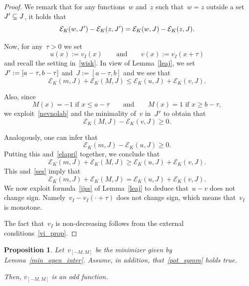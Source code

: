 \documentclass[10pt,a4paper]{amsart}
\newtheorem{prop}[theorem]{Proposition}
\numberwithin{equation}{section}
\newcommand{\Ec}{\mathcal{E}_K}
\begin{document}
\begin{proof}
We remark that for any functions~$w$ and~$z$ such that~$w=z$ outside a set~$J\rq{} \subseteq J$, it holds that
\begin{equation}\label{nevnolab}
\Ec(w,J\rq{})-\Ec(z,J\rq{})= \Ec(w,J)-\Ec(z,J).
\end{equation}

Now, for any~$\tau>0$ we set
\begin{equation*}
u(x):= v_I(x) \qquad\mbox{and}\qquad v(x) := v_I(x + \tau)
\end{equation*}
and recall the setting in~\eqref{wisk}. In view of Lemma~\ref{leaj}, we set~$J\rq{}:= [a-\tau, b-\tau]$ and~$J:=[a-\tau,b]$ and we see that
\begin{equation}\label{ses}
\Ec(m, J) + \Ec(M, J) \leq \Ec(u, J)  + \Ec(v, J).
\end{equation}

Also, since
\begin{equation*}
M(x)= -1 \mbox{ if } x \leq a-\tau \qquad\mbox{and}\qquad M(x)= 1 \mbox{ if } x \geq b-\tau,
\end{equation*}
we exploit~\eqref{nevnolab} and the minimality of~$v$ in~$J\rq{}$ to obtain that
\begin{equation}\label{elapri}
\Ec(M, J) - \Ec(v, J) \geq 0.
\end{equation}

Analogously, one can infer that
\begin{equation*}
\Ec(m, J) - \Ec(u, J) \geq 0.
\end{equation*}
Putting this and~\eqref{elapri} together, we conclude that
\begin{equation*}
\Ec(m, J) + \Ec(M, J) \geq \Ec(u, J)  +\Ec(v, J).
\end{equation*}
This and~\eqref{ses} imply that
\begin{equation*}
\Ec(m, J) + \Ec(M, J) = \Ec(u, J)  + \Ec(v, J).
\end{equation*}
We now exploit formula~\eqref{jjss} of Lemma~\ref{leaj} to deduce that~$u-v$ does not change sign. Namely~$v_I-v_I(\cdot+\tau)$ does not change sign, which means that~$v_I$ is monotone.

The fact that~$v_I$ is non-decreasing follows
from the external conditions~\eqref{vi_prop}.
\end{proof}

\begin{prop}\label{symm}
Let~$v_{[-M,M]}$ be the minimizer given by
Lemma~\ref{min_open_inter}. Assume, in addition, that~\eqref{pot_symm} holds true.

Then, $v_{[-M,M]}$ is an odd function.
\end{prop}
\end{document}
